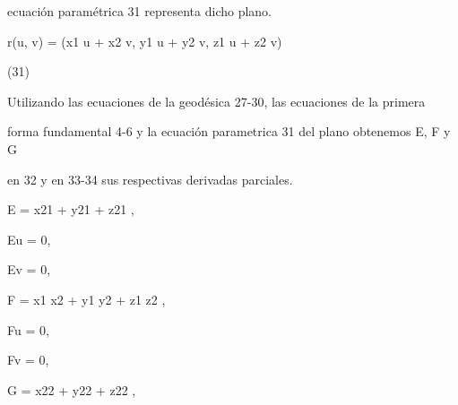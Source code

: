 \documentclass[a4paper,portrait,12pt]{article}
\begin{document}
\begin{flushleft}
ecuación paramétrica 31 representa dicho plano.
\end{flushleft}


\begin{flushleft}
r(u, v) = (x1 u + x2 v, y1 u + y2 v, z1 u + z2 v)
\end{flushleft}





(31)





\begin{flushleft}
Utilizando las ecuaciones de la geodésica 27-30, las ecuaciones de la primera
\end{flushleft}


\begin{flushleft}
forma fundamental 4-6 y la ecuación parametrica 31 del plano obtenemos E, F y G
\end{flushleft}


\begin{flushleft}
en 32 y en 33-34 sus respectivas derivadas parciales.
\end{flushleft}





\begin{flushleft}
\newpage
E = x21 + y21 + z21 ,
\end{flushleft}


\begin{flushleft}
Eu = 0,
\end{flushleft}


\begin{flushleft}
Ev = 0,
\end{flushleft}





\begin{flushleft}
F = x1 x2 + y1 y2 + z1 z2 ,
\end{flushleft}


\begin{flushleft}
Fu = 0,
\end{flushleft}


\begin{flushleft}
Fv = 0,
\end{flushleft}





\begin{flushleft}
G = x22 + y22 + z22 ,
\end{flushleft}
\end{document}
